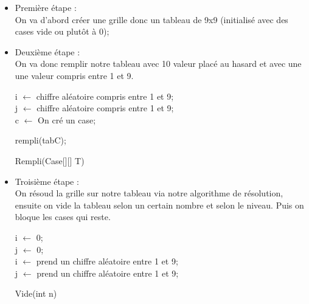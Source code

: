 \documentclass{article}
\begin{document}
\begin{itemize}
    \item Première étape : \\
    On va d'abord créer une grille donc un tableau de 9x9 (initialisé avec des cases vide ou plutôt à 0);
    \item Deuxième étape : \\
    On va donc remplir notre tableau avec 10 valeur placé au hasard et avec une une valeur compris entre 1 et 9. 
    

\begin{algorithm}[H]
\SetAlgoLined
{}

 i $\leftarrow$ chiffre aléatoire compris entre 1 et 9;\\
 j $\leftarrow$ chiffre aléatoire compris entre 1 et 9;\\
 c $\leftarrow$ On cré un case;

{
rempli(tabC);\\
}


\caption{Rempli(Case[][] T)}
\end{algorithm}

    \item Troisième étape : \\
    On résoud la grille sur notre tableau via notre algorithme de résolution, ensuite on vide la tableau selon un certain nombre et selon le niveau. Puis on bloque les cases qui reste.
    
\begin{algorithm}[H]
\SetAlgoLined
{}

 i $\leftarrow$ 0;\\
 j $\leftarrow$ 0;\\
    {
     i $\leftarrow$ prend un chiffre aléatoire entre 1 et 9;\\
 j $\leftarrow$ prend un chiffre aléatoire entre 1 et 9;\\
    }


\caption{Vide(int n)}
\end{algorithm}
\newpage
\end{itemize}
\end{document}
